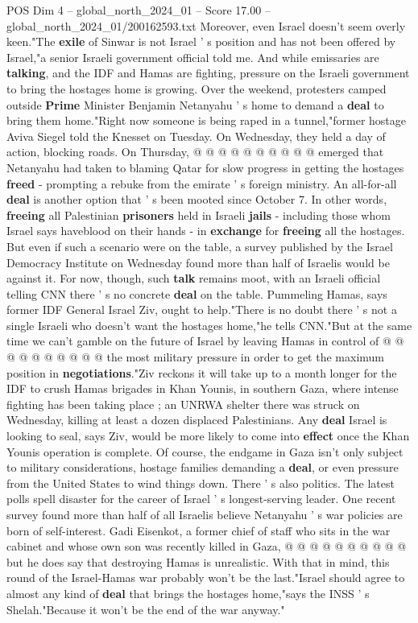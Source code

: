 \begin{textsample}{POS Dim 4 – global\_north\_2024\_01 – Score 17.00 – global\_north\_2024\_01/200162593.txt}
Moreover, even Israel doesn't seem overly keen."The \textbf{exile} of Sinwar is not Israel ' s position and has not been offered by Israel,"a senior Israeli government official told me.
And while emissaries are \textbf{talking}, and the IDF and Hamas are fighting, pressure on the Israeli government to bring the hostages home is growing.
Over the weekend, protesters camped outside \textbf{Prime} Minister Benjamin Netanyahu ' s home to demand a \textbf{deal} to bring them home."Right now someone is being raped in a tunnel,"former hostage Aviva Siegel told the Knesset on Tuesday.
On Wednesday, they held a day of action, blocking roads.
On Thursday, @ @ @ @ @ @ @ @ @ @ emerged that Netanyahu had taken to blaming Qatar for slow progress in getting the hostages \textbf{freed} - prompting a rebuke from the emirate ' s foreign ministry.
An all-for-all \textbf{deal} is another option that ' s been mooted since October 7.
In other words, \textbf{freeing} all Palestinian \textbf{prisoners} held in Israeli \textbf{jails} - including those whom Israel says haveblood on their hands - in \textbf{exchange} for \textbf{freeing} all the hostages.
But even if such a scenario were on the table, a survey published by the Israel Democracy Institute on Wednesday found more than half of Israelis would be against it.
For now, though, such \textbf{talk} remains moot, with an Israeli official telling CNN there ' s no concrete \textbf{deal} on the table.
Pummeling Hamas, says former IDF General Israel Ziv, ought to help."There is no doubt there ' s not a single Israeli who doesn't want the hostages home,"he tells CNN."But at the same time we can't gamble on the future of Israel by leaving Hamas in control of @ @ @ @ @ @ @ @ @ @ the most military pressure in order to get the maximum position in \textbf{negotiations}."Ziv reckons it will take up to a month longer for the IDF to crush Hamas brigades in Khan Younis, in southern Gaza, where intense fighting has been taking place ; an UNRWA shelter there was struck on Wednesday, killing at least a dozen displaced Palestinians.
Any \textbf{deal} Israel is looking to seal, says Ziv, would be more likely to come into \textbf{effect} once the Khan Younis operation is complete.
Of course, the endgame in Gaza isn't only subject to military considerations, hostage families demanding a \textbf{deal}, or even pressure from the United States to wind things down.
There ' s also politics.
The latest polls spell disaster for the career of Israel ' s longest-serving leader.
One recent survey found more than half of all Israelis believe Netanyahu ' s war policies are born of self-interest.
Gadi Eisenkot, a former chief of staff who sits in the war cabinet and whose own son was recently killed in Gaza, @ @ @ @ @ @ @ @ @ @ but he does say that destroying Hamas is unrealistic.
With that in mind, this round of the Israel-Hamas war probably won't be the last."Israel should agree to almost any kind of \textbf{deal} that brings the hostages home,"says the INSS ' s Shelah."Because it won't be the end of the war anyway."

\end{textsample}
